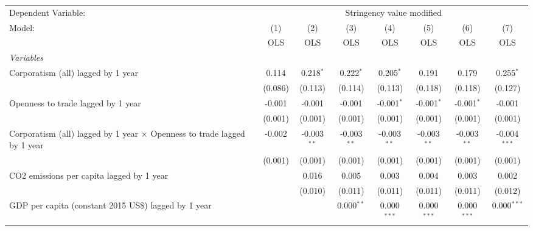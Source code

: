 
\begingroup
\centering
\begin{tabular}{lccccccc}
   \toprule
   Dependent Variable: & \multicolumn{7}{c}{Stringency value modified}\\
   Model:                                                                          & (1)     & (2)           & (3)           & (4)           & (5)           & (6)           & (7)\\  
                                                                                   &  OLS    & OLS           & OLS           & OLS           & OLS           & OLS           & OLS\\  
   \midrule
   \emph{Variables}\\
   Corporatism (all) lagged by 1 year                                              & 0.114   & 0.218$^{*}$   & 0.222$^{*}$   & 0.205$^{*}$   & 0.191         & 0.179         & 0.255$^{*}$\\   
                                                                                   & (0.086) & (0.113)       & (0.114)       & (0.113)       & (0.118)       & (0.118)       & (0.127)\\   
   Openness to trade lagged by 1 year                                              & -0.001  & -0.001        & -0.001        & -0.001$^{*}$  & -0.001$^{*}$  & -0.001$^{*}$  & -0.001\\   
                                                                                   & (0.001) & (0.001)       & (0.001)       & (0.001)       & (0.001)       & (0.001)       & (0.001)\\   
   Corporatism (all) lagged by 1 year $\times$ Openness to trade lagged by 1 year  & -0.002  & -0.003$^{**}$ & -0.003$^{**}$ & -0.003$^{**}$ & -0.003$^{**}$ & -0.003$^{**}$ & -0.004$^{***}$\\   
                                                                                   & (0.001) & (0.001)       & (0.001)       & (0.001)       & (0.001)       & (0.001)       & (0.001)\\   
   CO2 emissions per capita lagged by 1 year                                       &         & 0.016         & 0.005         & 0.003         & 0.004         & 0.003         & 0.002\\   
                                                                                   &         & (0.010)       & (0.011)       & (0.011)       & (0.011)       & (0.011)       & (0.012)\\   
   GDP per capita (constant 2015 US\$) lagged by 1 year                            &         &               & 0.000$^{**}$  & 0.000$^{***}$ & 0.000$^{***}$ & 0.000$^{***}$ & 0.000$^{***}$\\   

\end{tabular}
